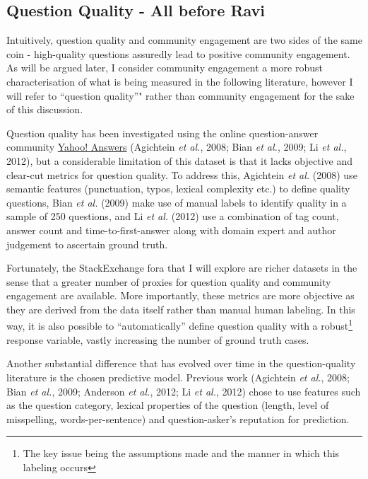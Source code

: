 \documentclass[11pt,preprint, authoryear]{article}
\numberwithin{equation}{section}
\numberwithin{figure}{section}
\let\rmarkdownfootnote\footnote%
\def\footnote{\protect\rmarkdownfootnote}
\begin{document}
\subsection{Question Quality - All before
Ravi}\label{question-quality---all-before-ravi}

Intuitively, question quality and community engagement are two sides of
the same coin - high-quality questions assuredly lead to positive
community engagement. As will be argued later, I consider community
engagement a more robust characterisation of what is being measured in
the following literature, however I will refer to ``question quality''"
rather than community engagement for the sake of this discussion.

Question quality has been investigated using the online question-answer
community \href{http://answers.yahoo.com}{Yahoo! Answers} (Agichtein
\emph{et al.}, 2008; Bian \emph{et al.}, 2009; Li \emph{et al.}, 2012),
but a considerable limitation of this dataset is that it lacks objective
and clear-cut metrics for question quality. To address this, Agichtein
\emph{et al.} (2008) use semantic features (punctuation, typos, lexical
complexity etc.) to define quality questions, Bian \emph{et al.} (2009)
make use of manual labels to identify quality in a sample of 250
questions, and Li \emph{et al.} (2012) use a combination of tag count,
answer count and time-to-first-answer along with domain expert and
author judgement to ascertain ground truth.

Fortunately, the StackExchange fora that I will explore are richer
datasets in the sense that a greater number of proxies for question
quality and community engagement are available. More importantly, these
metrics are more objective as they are derived from the data itself
rather than manual human labeling. In this way, it is also possible to
``automatically'' define question quality with a
robust\footnote{The key issue being the assumptions made and the manner in which this labeling occurs}
response variable, vastly increasing the number of ground truth cases.

Another substantial difference that has evolved over time in the
question-quality literature is the chosen predictive model. Previous
work (Agichtein \emph{et al.}, 2008; Bian \emph{et al.}, 2009; Anderson
\emph{et al.}, 2012; Li \emph{et al.}, 2012) chose to use features such
as the question category, lexical properties of the question (length,
level of misspelling, words-per-sentence) and question-asker's
reputation for prediction.
\end{document}
